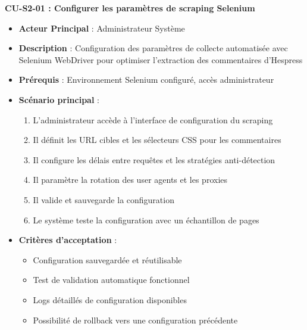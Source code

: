 \textbf{CU-S2-01 : Configurer les paramètres de scraping Selenium}
\begin{itemize}
    \item \textbf{Acteur Principal} : Administrateur Système
    \item \textbf{Description} : Configuration des paramètres de collecte automatisée avec Selenium WebDriver pour optimiser l'extraction des commentaires d'Hespress
    \item \textbf{Prérequis} : Environnement Selenium configuré, accès administrateur
    \item \textbf{Scénario principal} :
    \begin{enumerate}
        \item L'administrateur accède à l'interface de configuration du scraping
        \item Il définit les URL cibles et les sélecteurs CSS pour les commentaires
        \item Il configure les délais entre requêtes et les stratégies anti-détection
        \item Il paramètre la rotation des user agents et les proxies
        \item Il valide et sauvegarde la configuration
        \item Le système teste la configuration avec un échantillon de pages
    \end{enumerate}
    \item \textbf{Critères d'acceptation} :
    \begin{itemize}
        \item Configuration sauvegardée et réutilisable
        \item Test de validation automatique fonctionnel
        \item Logs détaillés de configuration disponibles
        \item Possibilité de rollback vers une configuration précédente
    \end{itemize}
\end{itemize}

